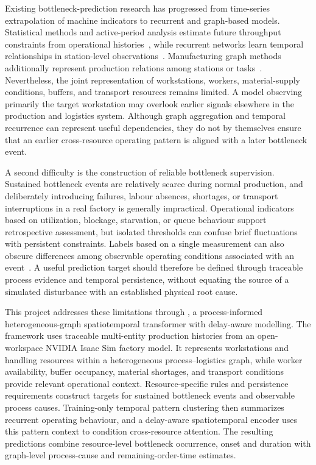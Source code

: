 Existing bottleneck-prediction research has progressed from time-series extrapolation of machine indicators to recurrent and graph-based models. Statistical methods and active-period analysis estimate future throughput constraints from operational histories~\cite{li2011throughput,subramaniyan2018data}, while recurrent networks learn temporal relationships in station-level observations~\cite{liu2023lstmdam}. Manufacturing graph methods additionally represent production relations among stations or tasks~\cite{lai2023bstan,yin2025btgcn}. Nevertheless, the joint representation of workstations, workers, material-supply conditions, buffers, and transport resources remains limited. A model observing primarily the target workstation may overlook earlier signals elsewhere in the production and logistics system. Although graph aggregation and temporal recurrence can represent useful dependencies, they do not by themselves ensure that an earlier cross-resource operating pattern is aligned with a later bottleneck event.

A second difficulty is the construction of reliable bottleneck supervision. Sustained bottleneck events are relatively scarce during normal production, and deliberately introducing failures, labour absences, shortages, or transport interruptions in a real factory is generally impractical. Operational indicators based on utilization, blockage, starvation, or queue behaviour support retrospective assessment, but isolated thresholds can confuse brief fluctuations with persistent constraints. Labels based on a single measurement can also obscure differences among observable operating conditions associated with an event~\cite{subramaniyan2023throughput,su2022dynamic}. A useful prediction target should therefore be defined through traceable process evidence and temporal persistence, without equating the source of a simulated disturbance with an established physical root cause.

This project addresses these limitations through , a process-informed heterogeneous-graph spatiotemporal transformer with delay-aware modelling. The framework uses traceable multi-entity production histories from an open-workspace NVIDIA Isaac Sim factory model. It represents workstations and handling resources within a heterogeneous process--logistics graph, while worker availability, buffer occupancy, material shortages, and transport conditions provide relevant operational context. Resource-specific rules and persistence requirements construct targets for sustained bottleneck events and observable process causes. Training-only temporal pattern clustering then summarizes recurrent operating behaviour, and a delay-aware spatiotemporal encoder uses this pattern context to condition cross-resource attention. The resulting predictions combine resource-level bottleneck occurrence, onset and duration with graph-level process-cause and remaining-order-time estimates.

